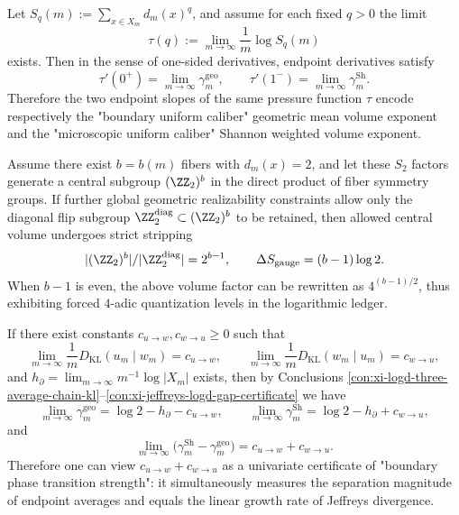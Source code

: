 \begin{conclusion}\label{con:xi-pressure-endpoints-geo-shannon}
Let
\(
S_q(m):=\sum_{x\in X_m} d_m(x)^q
\), and assume for each fixed \(q>0\) the limit
\[
\tau(q):=\lim_{m\to\infty}\frac{1}{m}\log S_q(m)
\]
exists.
Then in the sense of one-sided derivatives, endpoint derivatives satisfy
\[
\tau'(0^+)=\lim_{m\to\infty}\gamma_m^{\mathrm{geo}},
\qquad
\tau'(1^-)=\lim_{m\to\infty}\gamma_m^{\mathrm{Sh}}.
\]
Therefore the two endpoint slopes of the same pressure function \(\tau\) encode respectively the "boundary uniform caliber" geometric mean volume exponent and the "microscopic uniform caliber" Shannon weighted volume exponent.
\end{conclusion}

\begin{conclusion}\label{con:xi-gauge-center-diagonal-strip}
Assume there exist \(b=b(m)\) fibers with \(d_m(x)=2\), and let these \(S_2\) factors generate a central subgroup \((\ZZ_2)^b\) in the direct product of fiber symmetry groups.
If further global geometric realizability constraints allow only the diagonal flip subgroup \(\ZZ_2^{\mathrm{diag}}\subset(\ZZ_2)^b\) to be retained, then allowed central volume undergoes strict stripping
\[
|(\ZZ_2)^b|/|\ZZ_2^{\mathrm{diag}}|=2^{b-1},
\qquad
\Delta S_{\mathrm{gauge}}=(b-1)\log 2.
\]
When \(b-1\) is even, the above volume factor can be rewritten as \(4^{(b-1)/2}\), thus exhibiting forced \(4\)-adic quantization levels in the logarithmic ledger.
\end{conclusion}

\begin{conclusion}\label{con:xi-boundary-phase-transition-kl-rates}
If there exist constants \(c_{u\to w},c_{w\to u}\ge 0\) such that
\[
\lim_{m\to\infty}\frac{1}{m}D_{\mathrm{KL}}(u_m\mid w_m)=c_{u\to w},
\qquad
\lim_{m\to\infty}\frac{1}{m}D_{\mathrm{KL}}(w_m\mid u_m)=c_{w\to u},
\]
and \(h_\partial=\lim_{m\to\infty}m^{-1}\log|X_m|\) exists,
then by Conclusions \ref{con:xi-logd-three-average-chain-kl}--\ref{con:xi-jeffreys-logd-gap-certificate} we have
\[
\lim_{m\to\infty}\gamma_m^{\mathrm{geo}}=\log 2-h_\partial-c_{u\to w},
\qquad
\lim_{m\to\infty}\gamma_m^{\mathrm{Sh}}=\log 2-h_\partial+c_{w\to u},
\]
and
\[
\lim_{m\to\infty}\bigl(\gamma_m^{\mathrm{Sh}}-\gamma_m^{\mathrm{geo}}\bigr)=c_{u\to w}+c_{w\to u}.
\]
Therefore one can view \(c_{u\to w}+c_{w\to u}\) as a univariate certificate of "boundary phase transition strength": it simultaneously measures the separation magnitude of endpoint averages and equals the linear growth rate of Jeffreys divergence.
\end{conclusion}

